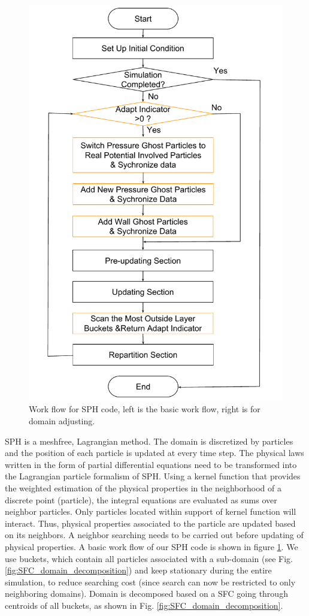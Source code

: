 \documentclass[procedia]{easychair}
\begin{document}
\begin{figure}[!t]
\includegraphics[scale=0.28]{Work_flow_adjust}
\caption{Work flow for SPH code, left is the basic work flow, right is for domain adjusting.}
\label{fig:Work_flow}
\end{figure}
SPH is a meshfree, Lagrangian method. The domain is discretized by particles and the position of each particle is updated at every time step. The physical laws written in the form of partial differential equations need to be transformed into the Lagrangian particle formalism of SPH. Using a kernel function that provides the weighted estimation of the physical properties in the neighborhood of a discrete point (particle), the integral equations are evaluated as sums over neighbor particles. Only particles located within support of kernel function will interact. Thus, physical properties associated to the particle are updated based on its neighbors. A neighbor searching needs to be carried out before updating of physical properties. A basic work flow of our SPH code is shown in figure \ref{fig:Work_flow}. We use buckets, which contain all particles associated with a sub-domain (see Fig. \ref{fig:SFC_domain_decomposition}) 
and keep stationary during the entire simulation, to reduce searching cost (since search can now be restricted to only neighboring domains).
Domain is decomposed based on a SFC going through centroids of all buckets, as shown in Fig. \ref{fig:SFC_domain_decomposition}.
\end{document}
